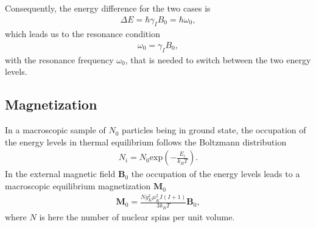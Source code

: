 \documentclass[a4paper,10pt]{article}
\begin{document}
Consequently, the energy difference for the two cases is
\begin{eqnarray}
 \Delta E = \hbar\gamma_I B_0 = \hbar \omega_0,
\end{eqnarray}
which leads us to the resonance condition 
\begin{eqnarray}
 \omega_0 = \gamma_I B_0,
\end{eqnarray}
with the resonance frequency $\omega_0$, that is needed to switch between the two energy levels.
 
\subsection{Magnetization}
In a macroscopic sample of $N_0$ particles being in ground state, the occupation of the energy levels in thermal equilibrium follows the Boltzmann distribution 
\begin{eqnarray}
 N_i = N_0 \text{exp}\left(-\frac{E_i}{k_B T} \right).
\end{eqnarray}
In the external magnetic field $\mathbf{B}_0$ the occupation of the energy levels leads to a macroscopic equilibrium magnetization $\mathbf{M}_0$ 
\begin{eqnarray}
 \mathbf{M}_0 = \frac{N g_K^2 \mu_K^2 I(I+1)}{3k_BT}\mathbf{B}_0,
\end{eqnarray}
where $N$ is here the number of nuclear spins per unit volume.
\end{document}
